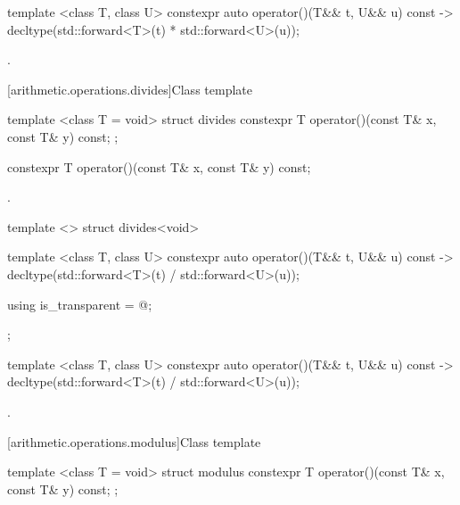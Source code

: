 %
\begin{itemdecl}
template <class T, class U> constexpr auto operator()(T&& t, U&& u) const
    -> decltype(std::forward<T>(t) * std::forward<U>(u));
\end{itemdecl}

\begin{itemdescr}
\pnum\returns {}.
\end{itemdescr}

[arithmetic.operations.divides]{Class template }

%
\begin{itemdecl}
template <class T = void> struct divides {
  constexpr T operator()(const T& x, const T& y) const;
};
\end{itemdecl}

%
\begin{itemdecl}
constexpr T operator()(const T& x, const T& y) const;
\end{itemdecl}

\begin{itemdescr}
\pnum\returns {}.
\end{itemdescr}

%
\begin{itemdecl}
template <> struct divides<void> {
  template <class T, class U> constexpr auto operator()(T&& t, U&& u) const
    -> decltype(std::forward<T>(t) / std::forward<U>(u));

  using is_transparent = @\unspec@;
};
\end{itemdecl}

%
\begin{itemdecl}
template <class T, class U> constexpr auto operator()(T&& t, U&& u) const
    -> decltype(std::forward<T>(t) / std::forward<U>(u));
\end{itemdecl}

\begin{itemdescr}
\pnum\returns {}.
\end{itemdescr}

[arithmetic.operations.modulus]{Class template }

%
\begin{itemdecl}
template <class T = void> struct modulus {
  constexpr T operator()(const T& x, const T& y) const;
};
\end{itemdecl}

